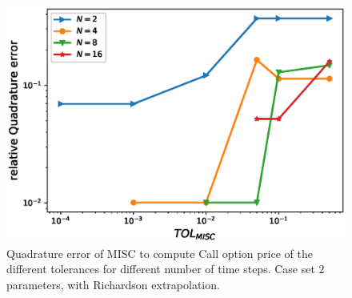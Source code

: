\documentclass[11pt]{article}
\begin{document}
\begin{figure}[h!]
	\centering
	\includegraphics[width=0.7\linewidth]{./figures/rBergomi_MISC_quadratre_error/vs_TOL/set2/relative_quad_error_wrt_MISC_TOL_set2_with_rich_linear}
	
	
	\caption{Quadrature error of MISC to compute Call option price of the different tolerances for different number of time steps. Case  set $2$ parameters, with Richardson extrapolation.}
	\label{fig:Quadrature_error_set2_linear_rich}
\end{figure}
\end{document}
